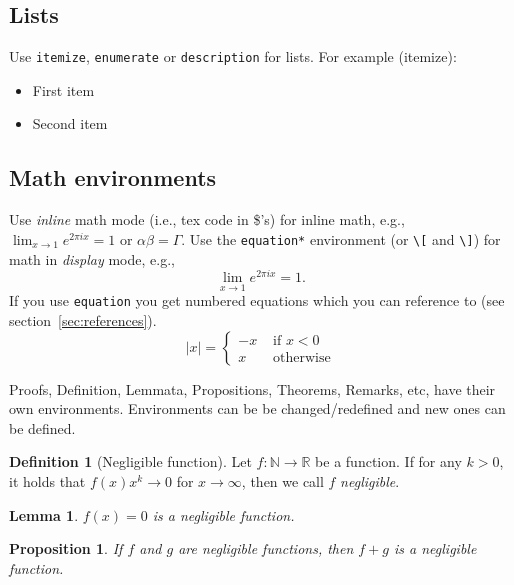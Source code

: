 \documentclass[11pt]{scrartcl}
\theoremstyle{plain} %
\newtheorem{proposition}[theorem]{Proposition}
\newtheorem{lemma}[theorem]{Lemma}
\theoremstyle{definition} %
\newtheorem{definition}[theorem]{Definition}
\theoremstyle{remark} %
\newcommand{\IN}{\mathbb{N}} %
\newcommand{\IR}{\mathbb{R}} %
\begin{document}
\subsection{Lists}
\label{subsec:lists}

Use \verb|itemize|, \verb|enumerate| or \verb|description| for lists.
For example (itemize):
\begin{itemize}
	\item First item
	\item Second item
\end{itemize}


\subsection{Math environments}
\label{subsec:math-env}

Use \emph{inline} math mode (i.e., tex code in \$'s) for inline math,
e.g., $\lim_{x \to 1} e^{2 \pi i x} = 1$ or $\alpha \beta = \Gamma$.
Use the \verb|equation*| environment (or \verb|\[| and \verb|\]|)
for math in \emph{display} mode, e.g.,
\begin{equation*}
	\lim_{x \to 1} e^{2 \pi i x} = 1.
\end{equation*}
If you use \verb|equation| you get numbered equations which you can reference to (see section~\ref{sec:references}).
\begin{equation}
	\label{eq:eqn}
	|x| = \left\{
	\begin{array}{rl}
		-x &\mbox{ if $x<0$} \\
		x &\mbox{ otherwise}
	\end{array}
	\right.
\end{equation}

Proofs, Definition, Lemmata, Propositions, Theorems, Remarks, etc, have their own environments.
Environments can be be changed/redefined and new ones can be defined.

\begin{definition}[Negligible function]
	\label{def:negl}
	Let $f \colon \IN \to \IR$ be a function.
	If for any $k > 0$, it holds that $f(x) x^k \rightarrow 0$ for $x \to \infty$,
	 then we call $f$ \emph{negligible}.
\end{definition}

\begin{lemma}
	$f(x) = 0$ is a negligible function.
\end{lemma}

\begin{proposition}
	If $f$ and $g$ are negligible functions,
	then $f + g$ is a negligible function.
\end{proposition}
\end{document}
